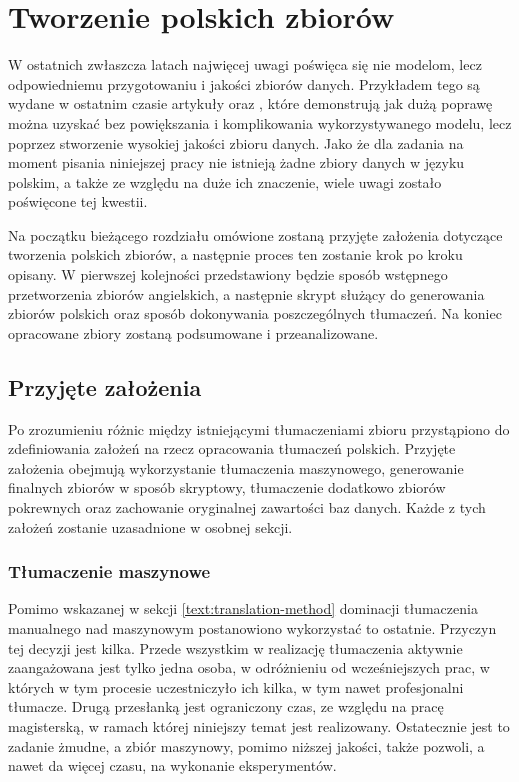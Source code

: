 \chapter{Tworzenie polskich zbiorów}
W ostatnich zwłaszcza latach najwięcej uwagi poświęca się nie modelom, lecz odpowiedniemu przygotowaniu i jakości zbiorów danych. Przykładem tego są wydane w ostatnim czasie artykuły   oraz  , które demonstrują jak dużą poprawę można uzyskać bez powiększania i komplikowania wykorzystywanego modelu, lecz poprzez stworzenie wysokiej jakości zbioru danych. Jako że dla zadania  na moment pisania niniejszej pracy nie istnieją żadne zbiory danych w języku polskim, a także ze względu na duże ich znaczenie, wiele uwagi zostało poświęcone tej kwestii. 

Na początku bieżącego rozdziału omówione zostaną przyjęte założenia dotyczące tworzenia polskich zbiorów, a następnie proces ten zostanie krok po kroku opisany. W pierwszej kolejności przedstawiony będzie sposób wstępnego przetworzenia zbiorów angielskich, a następnie skrypt służący do generowania zbiorów polskich oraz sposób dokonywania poszczególnych tłumaczeń. Na koniec opracowane zbiory zostaną podsumowane i przeanalizowane.

\section{Przyjęte założenia}
Po zrozumieniu różnic między istniejącymi tłumaczeniami zbioru  przystąpiono do zdefiniowania założeń na rzecz opracowania tłumaczeń polskich. Przyjęte założenia obejmują wykorzystanie tłumaczenia maszynowego, generowanie finalnych zbiorów w sposób skryptowy, tłumaczenie dodatkowo zbiorów pokrewnych oraz zachowanie oryginalnej zawartości baz danych. Każde z tych założeń zostanie uzasadnione w osobnej sekcji.
 

\subsection{Tłumaczenie maszynowe}
Pomimo wskazanej w sekcji \ref{text:translation-method} dominacji tłumaczenia manualnego nad maszynowym postanowiono wykorzystać to ostatnie. Przyczyn tej decyzji jest kilka. Przede wszystkim w realizację tłumaczenia aktywnie zaangażowana jest tylko jedna osoba, w odróżnieniu od wcześniejszych prac, w których w tym procesie uczestniczyło ich kilka, w tym nawet profesjonalni tłumacze. Drugą przesłanką jest ograniczony czas, ze względu na pracę magisterską, w ramach której niniejszy temat jest realizowany. Ostatecznie jest to zadanie żmudne, a zbiór maszynowy, pomimo niższej jakości, także pozwoli, a nawet da więcej czasu, na wykonanie eksperymentów.

